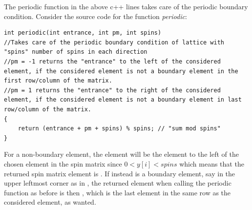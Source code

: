 The periodic function in the above c++ lines takes care of the periodic boundary condition. 
Consider the source code for the function \textit{periodic}:
\begin{lstlisting}
int periodic(int entrance, int pm, int spins)
//Takes care of the periodic boundary condition of lattice with "spins" number of spins in each direction
//pm = -1 returns the "entrance" to the left of the considered element, if the considered element is not a boundary element in the first row/column of the matrix. 
//pm = 1 returns the "entrance" to the right of the considered element, if the considered element is not a boundary element in last row/column of the matrix. 
{
    return (entrance + pm + spins) % spins; // "sum mod spins"
}
\end{lstlisting}
For a non-boundary element, the element 
 will be the element to the left of the chosen element 
 in the spin matrix since 
$0 < y[i] < spins$ which means that the returned spin matrix element is 
. 
If instead  is a boundary element, say in the upper leftmost corner as in , the returned element when calling the periodic function as before is then , which is the last element in the same row as the considered element, as wanted. 

